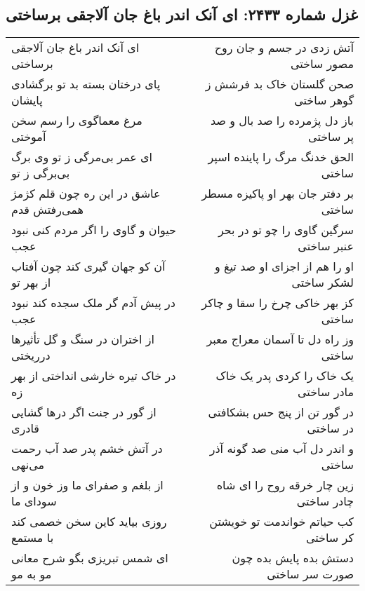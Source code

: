 \begin{center}
\section*{غزل شماره ۲۴۳۳: ای آنک اندر باغ جان آلاجقی برساختی}
\label{sec:2433}
\begin{longtable}{l p{0.5cm} r}
ای آنک اندر باغ جان آلاجقی برساختی
&&
آتش زدی در جسم و جان روح مصور ساختی
\\
پای درختان بسته بد تو برگشادی پایشان
&&
صحن گلستان خاک بد فرشش ز گوهر ساختی
\\
مرغ معماگوی را رسم سخن آموختی
&&
باز دل پژمرده را صد بال و صد پر ساختی
\\
ای عمر بی‌مرگی ز تو وی برگ بی‌برگی ز تو
&&
الحق خدنگ مرگ را پاینده اسپر ساختی
\\
عاشق در این ره چون قلم کژمژ همی‌رفتش قدم
&&
بر دفتر جان بهر او پاکیزه مسطر ساختی
\\
حیوان و گاوی را اگر مردم کنی نبود عجب
&&
سرگین گاوی را چو تو در بحر عنبر ساختی
\\
آن کو جهان گیری کند چون آفتاب از بهر تو
&&
او را هم از اجزای او صد تیغ و لشکر ساختی
\\
در پیش آدم گر ملک سجده کند نبود عجب
&&
کز بهر خاکی چرخ را سقا و چاکر ساختی
\\
از اختران در سنگ و گل تأثیرها درریختی
&&
وز راه دل تا آسمان معراج معبر ساختی
\\
در خاک تیره خارشی انداختی از بهر زه
&&
یک خاک را کردی پدر یک خاک مادر ساختی
\\
از گور در جنت اگر درها گشایی قادری
&&
در گور تن از پنج حس بشکافتی در ساختی
\\
در آتش خشم پدر صد آب رحمت می‌نهی
&&
و اندر دل آب منی صد گونه آذر ساختی
\\
از بلغم و صفرای ما وز خون و از سودای ما
&&
زین چار خرقه روح را ای شاه چادر ساختی
\\
روزی بیاید کاین سخن خصمی کند با مستمع
&&
کب حیاتم خواندمت تو خویشتن کر ساختی
\\
ای شمس تبریزی بگو شرح معانی مو به مو
&&
دستش بده پایش بده چون صورت سر ساختی
\\
\end{longtable}
\end{center}
